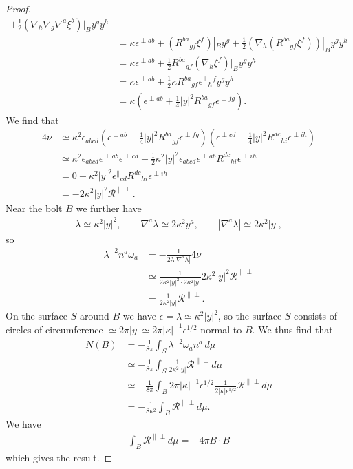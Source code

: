 \documentclass[a4paper,10pt,reqno]{amsart}
\newcommand{\bolt}{B}
\newcommand{\cR}{\mathcal{R}}
\theoremstyle{plain}
\numberwithin{equation}{section}
\newcommand{\eps}{\epsilon}
\begin{document}
\begin{proof}
\begin{align}
+ \frac{1}{2} (\nabla_h \nabla_g \nabla^a \xi^b)|_\bolt y^g y^h \\
&=
\kappa \eps^{\perp ab} + (R^{ba}{}_{gf} \xi^f)|_\bolt y^g
+ \frac{1}{2} (\nabla_h (R^{ba}{}_{gf} \xi^f))|_\bolt y^g y^h \\
&= \kappa \eps^{\perp ab} +
\frac{1}{2}R^{ba}{}_{gf} (\nabla_h \xi^f)|_\bolt y^g y^h \\
&=
\kappa \eps^{\perp ab} +
\frac{1}{2}\kappa R^{ba}{}_{gf} \eps^{\perp}{}_h{}^f y^g y^h \\
&=
\kappa \left(
\eps^{\perp ab} + \frac{1}{4}|y|^2 R^{ba}{}_{gf}\eps^{\perp fg} 
\right).
\end{align}
We find that 
\begin{align}
4\nu 
&\simeq
\kappa^2 \eps_{abcd}
\left(
\eps^{\perp ab} + \frac{1}{4}|y|^2 R^{ba}{}_{gf}\eps^{\perp fg} 
\right)
\left(
\eps^{\perp cd} + \frac{1}{4}|y|^2 R^{dc}{}_{hi}\eps^{\perp ih} 
\right) \\
&\simeq
\kappa^2 \eps_{abcd} \eps^{\perp ab} \eps^{\perp cd} 
+ \frac{1}{2}\kappa^2 |y|^2 \eps_{abcd} \eps^{\perp ab}
R^{dc}{}_{hi} \eps^{\perp ih} \\
&=
0 + 
\kappa^2 |y|^2 \eps^{\parallel}{}_{cd} R^{dc}{}_{hi} \eps^{\perp ih} \\
&=
- 2 \kappa^2 |y|^2 \cR^{\parallel\perp}. \label{eq:Rparper}
\end{align}
Near the bolt $\bolt$ we further have 
\begin{align}
\lambda \simeq \kappa^2 |y|^2, \qquad
\nabla^a \lambda \simeq 2 \kappa^2 y^a, \qquad 
|\nabla^a \lambda| \simeq 2 \kappa^2 |y|,
\end{align}
so
\begin{align}
\lambda^{-2} n^a \omega_a 
&= - \frac{1}{2\lambda|\nabla^a \lambda| } 4 \nu \\
&\simeq
\frac{1}{2 \kappa^2 |y|^2 \cdot 2 \kappa^2 |y|} 2 \kappa^2 |y|^2 \cR^{\parallel\perp} \\
&=
\frac{1}{2\kappa^2|y|}\cR^{\parallel\perp}. 
\end{align}
On the surface $S$ around $\bolt$ we have $\eps = \lambda \simeq \kappa^2 |y|^2$, so the surface $S$ consists of circles of circumference $\simeq 2\pi |y| \simeq 2\pi |\kappa|^{-1}\eps^{1/2}$ normal to $\bolt$. We thus find that
\begin{align}
N(\bolt) 
&= -\frac{1}{8\pi} \int_S \lambda^{-2} \omega_a n^a \, d\mu \\
&\simeq
- \frac{1}{8\pi} 
\int_S \frac{1}{2\kappa^2|y|}\cR^{\parallel\perp} d\mu \\
&\simeq
- \frac{1}{8\pi} 
\int_\bolt 2\pi |\kappa|^{-1}\eps^{1/2}
\frac{1}{2|\kappa| \eps^{1/2}}\cR^{\parallel\perp} d\mu \\
&=
- \frac{1}{8 \kappa^2} 
\int_\bolt \cR^{\parallel\perp} d\mu.
\end{align}
We have  
\begin{align}
\int_\bolt\mathcal{R}^{\parallel\perp}d\mu={}& 4\pi \bolt\!\cdot\! \bolt  
\end{align} 
which gives the result. 
\end{proof}
\end{document}

